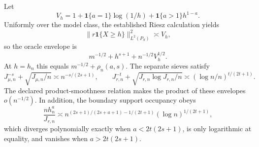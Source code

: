 Let
\[
V_h=1+\mathbf 1\{a=1\}\log(1/h)+\mathbf 1\{a>1\}h^{1-a}.
\]
Uniformly over the model class, the established Riesz calculation yields
\[
\|r\mathbf 1\{X\ge h\}\|_{L^2(P_S)}^2\asymp V_h,
\]
so the oracle envelope is
\[
m^{-1/2}+h^{s+1}+n^{-1/2}V_h^{1/2}.
\]
At \(h=h_n\) this equals \(m^{-1/2}+\rho_n(a,s)\). The separate sieves satisfy
\[
J_{\mu,n}^{-s}+\sqrt{J_{\mu,n}/n}\asymp n^{-s/(2s+1)},
\qquad
J_{r,n}^{-t}+\sqrt{J_{r,n}\log J_{r,n}/n}
\asymp(\log n/n)^{t/(2t+1)}.
\]
The declared product-smoothness relation makes the product of these envelopes \(o(n^{-1/2})\). In addition, the boundary support occupancy obeys
\[
\frac{n h_n^a}{J_{r,n}}\asymp
n^{(2s+1)/(2s+a+1)-1/(2t+1)}(\log n)^{1/(2t+1)},
\]
which diverges polynomially exactly when \(a<2t(2s+1)\), is only logarithmic at equality, and vanishes when \(a>2t(2s+1)\).